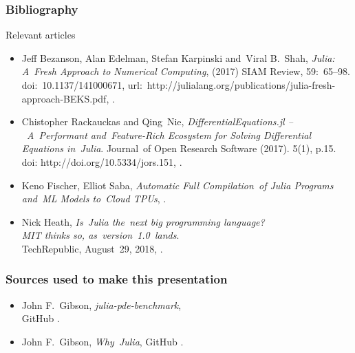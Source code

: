 \documentclass{beamer}  %
\begin{document}
\begin{frame}
  \frametitle{Bibliography}

  \begin{block}{Relevant articles}
    \begin{itemize}
    \item Jeff Bezanson, Alan Edelman, Stefan Karpinski and~Viral
      B.~Shah, \emph{Julia: A~Fresh Approach to Numerical Computing},
      (2017) SIAM Review, 59:~65--98. doi:~10.1137/141000671,
      url:~http://julialang.org/publications/julia-fresh-approach-BEKS.pdf,
      .
    \item Chistopher Rackauckas and Qing~Nie,
      \emph{DifferentialEquations.jl --~A~Performant and~Feature-Rich
        Ecosystem for Solving Differential Equations in~Julia}.
      Journal~of Open Research Software (2017). 5(1), p.15. doi:
      http://doi.org/10.5334/jors.151,
      .
    \item Keno Fischer, Elliot Saba, \emph{Automatic Full
        Compilation~of Julia Programs and~ML Models to~Cloud TPUs},
      .
    \item Nick Heath, \emph{Is~Julia the~next big programming
        language? \\
        MIT thinks so, as~version~1.0~lands}. \\
      TechRepublic, August~29, 2018,
      .
    \end{itemize}
  \end{block}
  
\end{frame}





\begin{frame}
  \frametitle{Sources used to make this presentation}

  \begin{block}{}
    \begin{itemize}
    \item John F.~Gibson, \emph{julia-pde-benchmark}, \\
      GitHub
      .
    \item John F.~Gibson, \emph{Why~Julia}, GitHub
      .
    \end{itemize}
  \end{block}

\end{frame}
\end{document}
